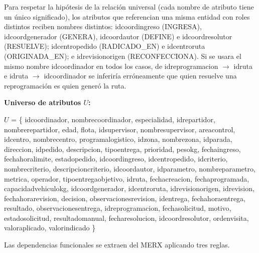\documentclass[11pt,a4paper]{article}
\newcommand{\ubrk}{\textunderscore\allowbreak}
\newcommand{\campo}[1]{\textnormal{\ttfamily\let\_\ubrk #1}}
\begin{document}
Para respetar la hipótesis de la relación universal (cada nombre de atributo tiene un único significado), los atributos que referencian una misma entidad con roles distintos reciben nombres distintos: \campo{id\_coord\_ingreso} (INGRESA), \campo{id\_coord\_generador} (GENERA), \campo{id\_coord\_autor} (DEFINE) e \campo{id\_coord\_resolutor} (RESUELVE); \campo{id\_centro\_pedido} (RADICADO\_EN) e \campo{id\_centro\_ruta} (ORIGINADA\_EN); e \campo{id\_revision\_origen} (RECONFECCIONA). Si se usara el mismo nombre \campo{id\_coordinador} en todos los casos, de \campo{id\_reprogramacion} $\rightarrow$ \campo{id\_ruta} e \campo{id\_ruta} $\rightarrow$ \campo{id\_coordinador} se inferiría erróneamente que quien resuelve una reprogramación es quien generó la ruta.

\textbf{Universo de atributos $U$:}

{\raggedright\small
$U$ = \{ \campo{id\_coordinador}, \campo{nombre\_coordinador}, \campo{especialidad}, \campo{id\_repartidor}, \campo{nombre\_repartidor}, \campo{edad}, \campo{flota}, \campo{id\_supervisor}, \campo{nombre\_supervisor}, \campo{area\_control}, \campo{id\_centro}, \campo{nombre\_centro}, \campo{programa\_logistico}, \campo{id\_zona}, \campo{nombre\_zona}, \campo{id\_parada}, \campo{direccion}, \campo{id\_pedido}, \campo{descripcion}, \campo{tipo\_entrega}, \campo{prioridad}, \campo{peso\_kg}, \campo{fecha\_ingreso}, \campo{fecha\_hora\_limite}, \campo{estado\_pedido}, \campo{id\_coord\_ingreso}, \campo{id\_centro\_pedido}, \campo{id\_criterio}, \campo{nombre\_criterio}, \campo{descripcion\_criterio}, \campo{id\_coord\_autor}, \campo{id\_parametro}, \campo{nombre\_parametro}, \campo{metrica}, \campo{operador}, \campo{tipo\_entrega\_objetivo}, \campo{id\_ruta}, \campo{fecha\_creacion}, \campo{fecha\_programada}, \campo{capacidad\_vehiculo\_kg}, \campo{id\_coord\_generador}, \campo{id\_centro\_ruta}, \campo{id\_revision\_origen}, \campo{id\_revision}, \campo{fecha\_hora\_revision}, \campo{decision}, \campo{observaciones\_revision}, \campo{id\_entrega}, \campo{fecha\_hora\_entrega}, \campo{resultado}, \campo{observaciones\_entrega}, \campo{id\_reprogramacion}, \campo{fecha\_solicitud}, \campo{motivo}, \campo{estado\_solicitud}, \campo{resultado\_manual}, \campo{fecha\_resolucion}, \campo{id\_coord\_resolutor}, \campo{orden\_visita}, \campo{valor\_aplicado}, \campo{valor\_indicado} \}
\par}

Las dependencias funcionales se extraen del MERX aplicando tres reglas.
\end{document}
